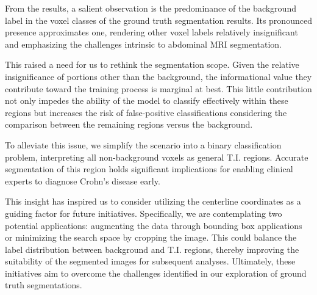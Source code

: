 From the results, a salient observation is the predominance of the background label in the voxel classes of the ground truth segmentation results. Its pronounced presence approximates one, rendering other voxel labels relatively insignificant and emphasizing the challenges intrinsic to abdominal MRI segmentation.

This raised a need for us to rethink the segmentation scope. Given the relative insignificance of portions other than the background, the informational value they contribute toward the training process is marginal at best. This little contribution not only impedes the ability of the model to classify effectively within these regions but increases the risk of false-positive classifications considering the comparison between the remaining regions versus the background. 

To alleviate this issue, we simplify the scenario into a binary classification problem, interpreting all non-background voxels as general T.I. regions. Accurate segmentation of this region holds significant implications for enabling clinical experts to diagnose Crohn's disease early.

This insight has inspired us to consider utilizing the centerline coordinates as a guiding factor for future initiatives. Specifically, we are contemplating two potential applications: augmenting the data through bounding box applications or minimizing the search space by cropping the image. This could balance the label distribution between background and T.I. regions, thereby improving the suitability of the segmented images for subsequent analyses. Ultimately, these initiatives aim to overcome the challenges identified in our exploration of ground truth segmentations.


